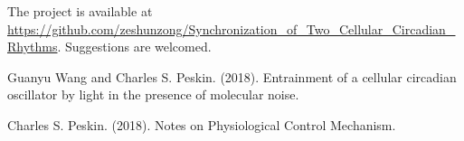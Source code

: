 \documentclass[12pt]{article}
\renewcommand{\(}{\left (}
\renewcommand{\)}{\right )}
\begin{document}
The project is available at \url{https://github.com/zeshunzong/Synchronization_of_Two_Cellular_Circadian_Rhythms}. Suggestions are welcomed.


\begin{thebibliography}{9}


	Guanyu Wang and Charles S. Peskin. (2018).
	Entrainment of a cellular circadian oscillator by light in the presence of molecular noise.

	Charles S. Peskin. (2018).
	Notes on Physiological Control Mechanism.


\end{thebibliography}
\end{document}
